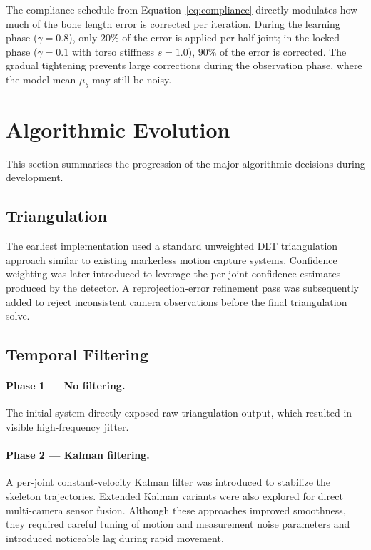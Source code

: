 \documentclass[11pt,a4paper]{article}
\begin{document}
The compliance schedule from Equation~\eqref{eq:compliance} directly modulates how
much of the bone length error is corrected per iteration. During the learning phase
($\gamma = 0.8$), only $20\%$ of the error is applied per half-joint; in the locked
phase ($\gamma = 0.1$ with torso stiffness $s=1.0$), $90\%$ of the error is corrected.
The gradual tightening prevents large corrections during the observation phase, where
the model mean $\mu_b$ may still be noisy.
\section{Algorithmic Evolution}

This section summarises the progression of the major algorithmic decisions during
development.

\subsection{Triangulation}

The earliest implementation used a standard unweighted DLT triangulation approach
similar to existing markerless motion capture systems. Confidence weighting was later
introduced to leverage the per-joint confidence estimates produced by the detector.
A reprojection-error refinement pass was subsequently added to reject inconsistent
camera observations before the final triangulation solve.

\subsection{Temporal Filtering}

\paragraph{Phase 1 — No filtering.}
The initial system directly exposed raw triangulation output, which resulted in
visible high-frequency jitter.

\paragraph{Phase 2 — Kalman filtering.}
A per-joint constant-velocity Kalman filter was introduced to stabilize the
skeleton trajectories. Extended Kalman variants were also explored for direct
multi-camera sensor fusion. Although these approaches improved smoothness, they
required careful tuning of motion and measurement noise parameters and introduced
noticeable lag during rapid movement.
\end{document}
